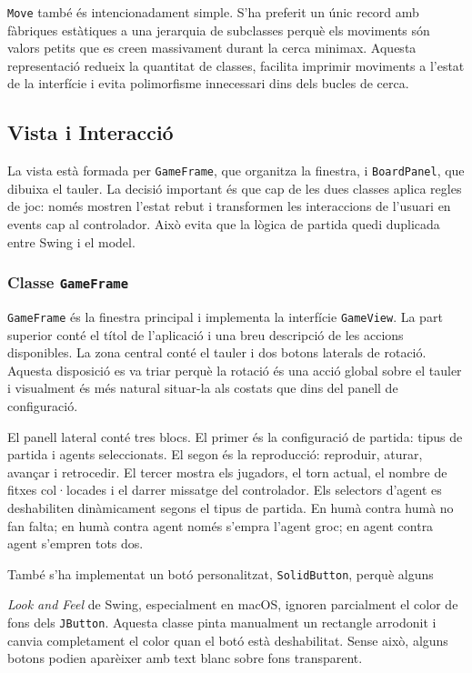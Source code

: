 \documentclass[conference,compsoc]{IEEEtran}
\begin{document}
\texttt{Move} també és intencionadament simple. S'ha preferit un únic record amb
fàbriques estàtiques a una jerarquia de subclasses perquè els moviments són valors
petits que es creen massivament durant la cerca minimax. Aquesta representació
redueix la quantitat de classes, facilita imprimir moviments a l'estat de la
interfície i evita polimorfisme innecessari dins dels bucles de cerca.

\subsection{Vista i Interacció}

La vista està formada per \texttt{GameFrame}, que organitza la finestra, i
\texttt{BoardPanel}, que dibuixa el tauler. La decisió important és que cap de les
dues classes aplica regles de joc: només mostren l'estat rebut i transformen les
interaccions de l'usuari en events cap al controlador. Això evita que la lògica de
partida quedi duplicada entre Swing i el model.

\subsubsection{Classe \texttt{GameFrame}}

\texttt{GameFrame} és la finestra principal i implementa la interfície
\texttt{GameView}. La part superior conté el títol de l'aplicació i una breu
descripció de les accions disponibles. La zona central conté el tauler i dos
botons laterals de rotació. Aquesta disposició es va triar perquè la rotació és
una acció global sobre el tauler i visualment és més natural situar-la als costats
que dins del panell de configuració.

El panell lateral conté tres blocs. El primer és la configuració de partida: tipus
de partida i agents seleccionats. El segon és la reproducció: reproduir, aturar,
avançar i retrocedir. El tercer mostra els jugadors, el torn actual, el nombre de
fitxes col·locades i el darrer missatge del controlador. Els selectors d'agent es
deshabiliten dinàmicament segons el tipus de partida. En humà contra humà no fan
falta; en humà contra agent només s'empra l'agent groc; en agent contra agent
s'empren tots dos.

També s'ha implementat un botó personalitzat, \texttt{SolidButton}, perquè alguns

\textit{Look and Feel} de Swing, especialment en macOS, ignoren parcialment el
color de fons dels \texttt{JButton}. Aquesta classe pinta manualment un rectangle
arrodonit i canvia completament el color quan el botó està deshabilitat. Sense
això, alguns botons podien aparèixer amb text blanc sobre fons transparent.
\end{document}
